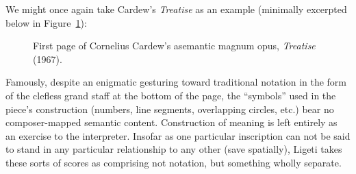     We might once again take Cardew's \textit{Treatise} as an example (minimally excerpted below in Figure~\ref{fig:Treatise1}):

            \begin{figure} 
                \centering
                \captionsetup{width=.5\textwidth}
                \caption[First page of Cornelius Cardew's asemantic magnum opus, \textit{Treatise}(1967).]{First page of Cornelius Cardew's asemantic magnum opus, \textit{Treatise} (1967).\footnotemark}
                \label{fig:Treatise1}
            \end{figure}

    \noindent Famously, despite an enigmatic gesturing toward traditional notation in the form of the clefless grand staff at the bottom of the page, the ``symbols'' used in the piece's construction (numbers, line segments, overlapping circles, etc.) bear no composer-mapped semantic content. Construction of meaning is left entirely as an exercise to the interpreter. Insofar as one particular inscription can not be said to stand in any particular relationship to any other (save spatially), Ligeti takes these sorts of scores as comprising not notation, but something wholly separate.

